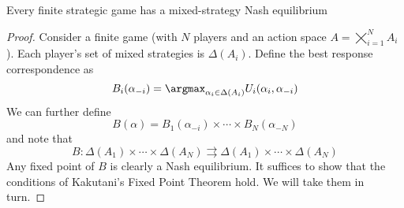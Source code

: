 \documentclass[10pt]{article}
\begin{document}
\begin{theorem}
	 Every finite strategic game has a mixed-strategy Nash equilibrium
\end{theorem}
\begin{proof}
	Consider a finite game (with $N$ players and an action space $A = \bigtimes_{i=1}^N A_i$). Each player's set of mixed strategies is $\Delta(A_i)$. Define the best response correspondence as \[B_i(\alpha_{-i}) = \argmax_{\alpha_i \in \Delta(A_i)}U_i(\alpha_i,\alpha_{-i})\] We can further define \[B(\alpha) = B_1(\alpha_{-i}) \times \cdots \times B_N(\alpha_{-N})\]and note that\[B: \Delta(A_1) \times \cdots \times \Delta(A_N) \rightrightarrows \Delta(A_1) \times \cdots \times \Delta(A_N)\]Any fixed point of $B$ is clearly a Nash equilibrium. It suffices to show that the conditions of Kakutani's Fixed Point Theorem hold. We will take them in turn.
	

\end{proof}
\end{document}
